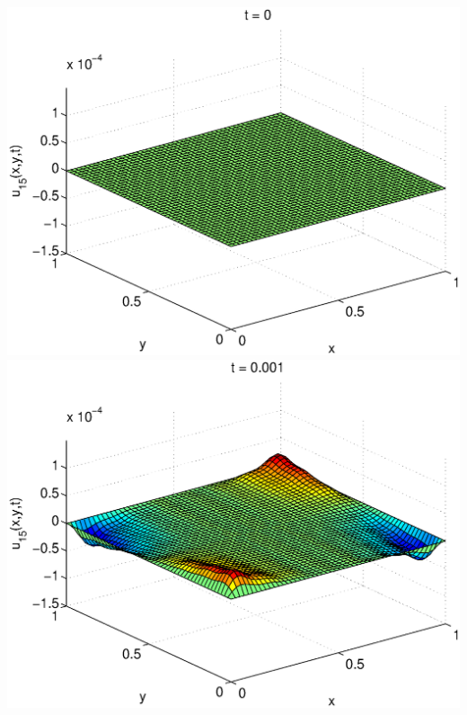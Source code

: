\begin{solution}
\begin{enumerate}
\includegraphics[scale=0.4]{heat2d1}
\includegraphics[scale=0.4]{heat2d2}


\end{enumerate}
\end{solution}
